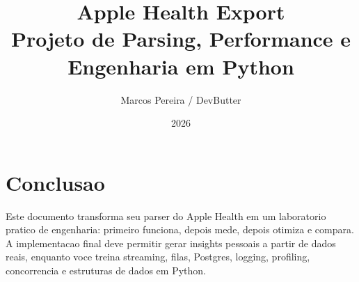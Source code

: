 \documentclass[11pt,a4paper,oneside]{book}
\title{\Huge Apple Health Export\\[0.3em]\Large Projeto de Parsing, Performance e Engenharia em Python}
\author{Marcos Pereira / DevButter}
\date{2026}
\begin{document}
\frontmatter
\maketitle
\tableofcontents

\mainmatter















\backmatter
\chapter*{Conclusao}
Este documento transforma seu parser do Apple Health em um laboratorio pratico de engenharia: primeiro funciona, depois mede, depois otimiza e compara. A implementacao final deve permitir gerar insights pessoais a partir de dados reais, enquanto voce treina streaming, filas, Postgres, logging, profiling, concorrencia e estruturas de dados em Python.
\end{document}
